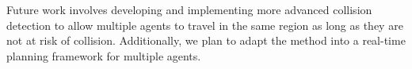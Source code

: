 \documentclass[letterpaper, 10 pt, conference]{ieeeconf}  %
\begin{document}
Future work involves developing and implementing more advanced collision detection to allow multiple agents to travel in the same region as long as they are not at risk of collision. Additionally, we plan to adapt the method into a real-time planning framework for multiple agents.

\FloatBarrier

\newpage


\end{document}
